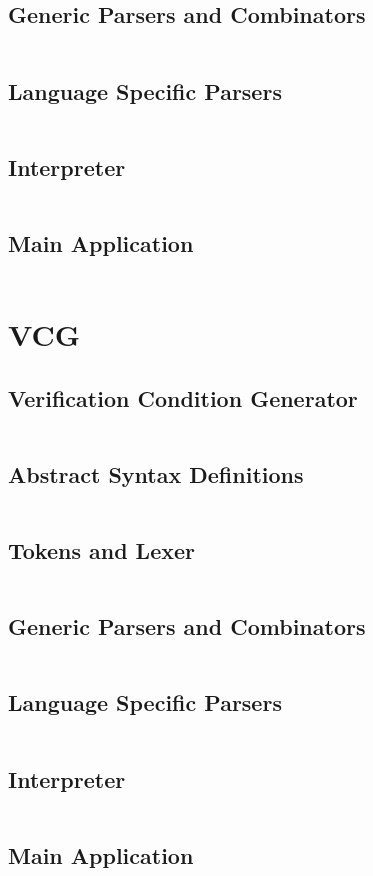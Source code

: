 \documentclass[a4paper,9pt,twoside]{book}
\newcommand{\hsfile}[1]{\inputminted[breaklines]{haskell}{../haskell/#1.hs}}
\begin{document}
\section{Generic Parsers and Combinators}
\hsfile{interpreter/ParserCombis2}
\section{Language Specific Parsers}
\hsfile{interpreter/Parser2}
\section{Interpreter}
\hsfile{interpreter/Interpreter}
\section{Main Application}
\hsfile{interpreter/Main}

\chapter{VCG}
\section{Verification Condition Generator}
\hsfile{vcg/VCG}
\section{Abstract Syntax Definitions}
\hsfile{vcg/AbsSyn}
\section{Tokens and Lexer}
\hsfile{vcg/Scanner}
\section{Generic Parsers and Combinators}
\hsfile{vcg/ParserCombis}
\section{Language Specific Parsers}
\hsfile{vcg/Parser}
\section{Interpreter}
\hsfile{vcg/Interpreter}
\section{Main Application}
\hsfile{vcg/Main}
\end{document}
